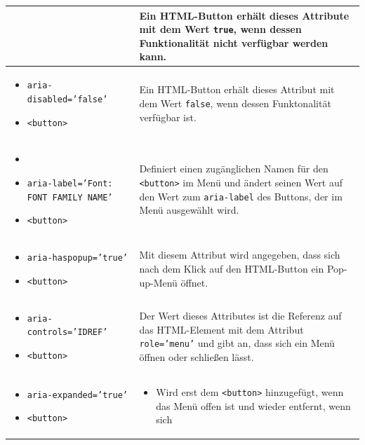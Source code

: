 \begin{longtable}{| p{} | p{} |}
	& Ein HTML-Button erhält dieses Attribute mit dem Wert \texttt{true}, wenn dessen
		Funktionalität nicht verfügbar werden kann.\\
	\hline
	\begin{itemize}[label={}, leftmargin=*]
		\item \texttt{aria-disabled='false'} 
		\item \texttt{<button>}
	\end{itemize}
	& Ein HTML-Button erhält dieses Attribut mit dem Wert \texttt{false}, wenn dessen
		Funktonalität verfügbar ist. \\
	\hline
	\begin{itemize}[label={}, leftmargin=*]
		\item \texttt{} 
		\item \texttt{aria-label='Font: FONT FAMILY NAME'} 
		\item \texttt{<button>}
	\end{itemize}
	& Definiert einen zugänglichen Namen für den \texttt{<button>} im Menü und ändert seinen Wert auf den Wert
		zum \texttt{aria-label} des Buttons, der im Menü ausgewählt wird.\\
	\hline
	\begin{itemize}[label={}, leftmargin=*]
		\item \texttt{aria-haspopup='true'} 
		\item \texttt{<button>}
	\end{itemize}
	& Mit diesem Attribut wird angegeben, dass sich nach dem Klick auf den HTML-Button ein Pop-up-Menü 
	öffnet.\\
	\hline
	\begin{itemize}[label={}, leftmargin=*]
		\item \texttt{aria-controls='IDREF'} 
		\item \texttt{<button>}
	\end{itemize}
	& Der Wert dieses Attributes ist die Referenz auf das HTML-Element mit dem Attribut \texttt{role='menu'} und 
		gibt an, dass sich ein Menü öffnen oder schließen lässt.\\
	\hline
	\begin{itemize}[label={}, leftmargin=*]
		\item \texttt{aria-expanded='true'} 
		\item \texttt{<button>}
	\end{itemize}
	& \begin{itemize}[label={}, leftmargin=*]
		\item Wird erst dem \texttt{<button>} hinzugefügt, wenn das Menü offen ist und wieder entfernt, wenn sich

\end{itemize}
\end{longtable}
